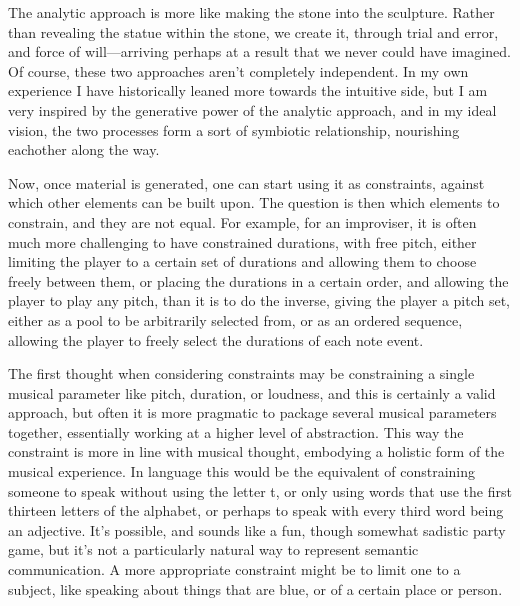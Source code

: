 \documentclass[12pt,twoside,maitrise]{dms}
\theoremstyle{definition}
\begin{document}
The analytic approach is more like making the stone into the sculpture.
Rather than revealing the statue within the stone, we create it, through trial and error, and force of will—arriving perhaps at a result that we never could have imagined.
Of course, these two approaches aren’t completely independent.
In my own experience I have historically leaned more towards the intuitive side, but I am very inspired by the generative power of the analytic approach, and in my ideal vision, the two processes form a sort of symbiotic relationship, nourishing eachother along the way.

Now, once material is generated, one can start using it as constraints, against which other elements can be built upon.
The question is then which elements to constrain, and they are not equal.
For example, for an improviser, it is often much more challenging to have constrained durations, with free pitch, either limiting the player to a certain set of durations and allowing them to choose freely between them, or placing the durations in a certain order, and allowing the player to play any pitch, than it is to do the inverse, giving the player a pitch set, either as a pool to be arbitrarily selected from, or as an ordered sequence, allowing the player to freely select the durations of each note event.

The first thought when considering constraints may be constraining a single musical parameter like pitch, duration, or loudness, and this is certainly a valid approach, but often it is more pragmatic to package several musical parameters together, essentially working at a higher level of abstraction.
This way the constraint is more in line with musical thought, embodying a holistic form of the musical experience.
In language this would be the equivalent of constraining someone to speak without using the letter t, or only using words that use the first thirteen letters of the alphabet, or perhaps to speak with every third word being an adjective.
It’s possible, and sounds like a fun, though somewhat sadistic party game, but it’s not a particularly natural way to represent semantic communication.
A more appropriate constraint might be to limit one to a subject, like speaking about things that are blue, or of a certain place or person.
\end{document}
